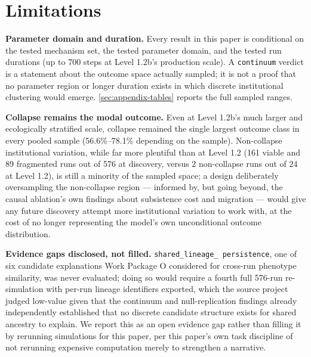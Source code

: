 \section{Limitations}
\label{sec:limitations}

\begin{table}[htbp]
\centering
\caption{Summary of model and evidentiary limitations.}
\label{tab:limitations}
\end{table}

\textbf{Parameter domain and duration.} Every result in this paper is
conditional on the tested mechanism set, the tested parameter domain, and
the tested run durations (up to 700 steps at Level 1.2b's production
scale). A \texttt{continuum} verdict is a statement about the outcome
space actually sampled; it is not a proof that no parameter region or
longer duration exists in which discrete institutional clustering would
emerge. \cref{sec:appendix-tables} reports the full sampled ranges.

\textbf{Collapse remains the modal outcome.} Even at Level 1.2b's much
larger and ecologically stratified scale, collapse remained the single
largest outcome class in every pooled sample (56.6\%--78.1\% depending on
the sample). Non-collapse institutional variation, while far more
plentiful than at Level 1.2 (161 viable and 89 fragmented runs out of 576
at discovery, versus 2 non-collapse runs out of 24 at Level 1.2), is still
a minority of the sampled space; a design deliberately oversampling the
non-collapse region --- informed by, but going beyond, the causal
ablation's own findings about subsistence cost and migration --- would
give any future discovery attempt more institutional variation to work
with, at the cost of no longer representing the model's own unconditional
outcome distribution.

\textbf{Evidence gaps disclosed, not filled.} \texttt{shared\_lineage\_%
persistence}, one of six candidate explanations Work Package O considered
for cross-run phenotype similarity, was never evaluated; doing so would
require a fourth full 576-run re-simulation with per-run lineage
identifiers exported, which the source project judged low-value given
that the continuum and null-replication findings already independently
established that no discrete candidate structure exists for shared
ancestry to explain. We report this as an open evidence gap rather than
filling it by rerunning simulations for this paper, per this paper's own
task discipline of not rerunning expensive computation merely to
strengthen a narrative.

